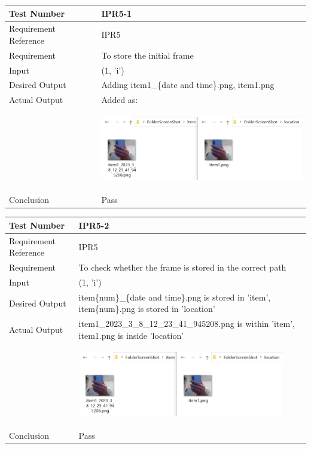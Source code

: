 \documentclass[12pt, titlepage]{article}
\begin{document}
\begin{table}[H]
\begin{center}
\begin{tabular}{|l | m{9cm}|}
\hline
  Test Number & IPR5-1\\
  \hline
  Requirement Reference & IPR5\\
  \hline
  Requirement &  To store the initial frame\\
  \hline
  Input & (1, 'i')\\
  \hline
  Desired Output & Adding item1\_\{date and time\}.png,  item1.png\\
  \hline
  Actual Output & Added as:\\&\includegraphics[width=90mm, height=35mm]{UT2.png}\\
  \hline
  Conclusion & Pass\\
  \hline
\end{tabular}
\end{center}           
\end{table}
\begin{table}[H]
\begin{center}
\begin{tabular}{|l | m{9cm}|}
\hline
  Test Number & IPR5-2\\
  \hline
  Requirement Reference & IPR5\\
  \hline
  Requirement &  To check whether the frame is stored in the correct path\\
  \hline
  Input & (1, 'i')\\
  \hline
  Desired Output &  item\{num\}\_\{date and time\}.png is stored in 'item', item\{num\}.png is stored in 'location'\\
  \hline
  Actual Output &  item1\_2023\_3\_8\_12\_23\_41\_945208.png is within 'item', item1.png is inside 'location'\\&\includegraphics[width=90mm, height=35mm]{UT2.png}\\
  \hline
  Conclusion & Pass\\
  \hline
\end{tabular}
\end{center}           
\end{table}
\end{document}
